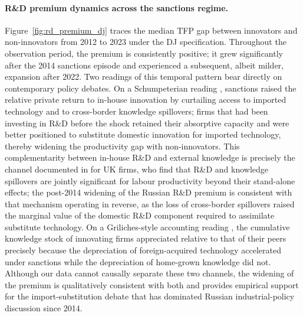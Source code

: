 \documentclass[a4paper, 12pt]{article}
\begin{document}
\paragraph{R\&D premium dynamics across the sanctions regime.} Figure~\ref{fig:rd_premium_dj} traces the median TFP gap between innovators and non-innovators from 2012 to 2023 under the DJ specification. Throughout the observation period, the premium is consistently positive; it grew significantly after the 2014 sanctions episode and experienced a subsequent, albeit milder, expansion after 2022. Two readings of this temporal pattern bear directly on contemporary policy debates. On a Schumpeterian reading \parencite{aghion1990model}, sanctions raised the relative private return to in-house innovation by curtailing access to imported technology and to cross-border knowledge spillovers; firms that had been investing in R\&D before the shock retained their absorptive capacity and were better positioned to substitute domestic innovation for imported technology, thereby widening the productivity gap with non-innovators. This complementarity between in-house R\&D and external knowledge is precisely the channel documented in \textcite{Audretsch2020The} for UK firms, who find that R\&D and knowledge spillovers are jointly significant for labour productivity beyond their stand-alone effects; the post-2014 widening of the Russian R\&D premium is consistent with that mechanism operating in reverse, as the loss of cross-border spillovers raised the marginal value of the domestic R\&D component required to assimilate substitute technology. On a Griliches-style accounting reading \parencite{griliches1979issues}, the cumulative knowledge stock of innovating firms appreciated relative to that of their peers precisely because the depreciation of foreign-acquired technology accelerated under sanctions while the depreciation of home-grown knowledge did not. Although our data cannot causally separate these two channels, the widening of the premium is qualitatively consistent with both and provides empirical support for the import-substitution debate that has dominated Russian industrial-policy discussion since 2014.
\end{document}
